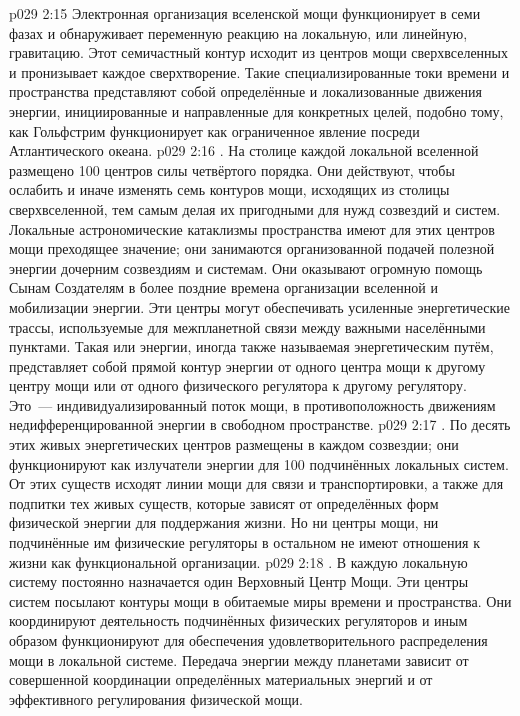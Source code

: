 \vs p029 2:15 Электронная организация вселенской мощи функционирует в семи фазах и обнаруживает переменную реакцию на локальную, или линейную, гравитацию. Этот семичастный контур исходит из центров мощи сверхвселенных и пронизывает каждое сверхтворение. Такие специализированные токи времени и пространства представляют собой определённые и локализованные движения энергии, инициированные и направленные для конкретных целей, подобно тому, как Гольфстрим функционирует как ограниченное явление посреди Атлантического океана.
\vs p029 2:16 . На столице каждой локальной вселенной размещено 100 центров силы четвёртого порядка. Они действуют, чтобы ослабить и иначе изменять семь контуров мощи, исходящих из столицы сверхвселенной, тем самым делая их пригодными для нужд созвездий и систем. Локальные астрономические катаклизмы пространства имеют для этих центров мощи преходящее значение; они занимаются организованной подачей полезной энергии дочерним созвездиям и системам. Они оказывают огромную помощь Сынам Создателям в более поздние времена организации вселенной и мобилизации энергии. Эти центры могут обеспечивать усиленные энергетические трассы, используемые для межпланетной связи между важными населёнными пунктами. Такая  или  энергии, иногда также называемая энергетическим путём, представляет собой прямой контур энергии от одного центра мощи к другому центру мощи или от одного физического регулятора к другому регулятору. Это~--- индивидуализированный поток мощи, в противоположность движениям недифференцированной энергии в свободном пространстве.
\vs p029 2:17 . По десять этих живых энергетических центров размещены в каждом созвездии; они функционируют как излучатели энергии для 100 подчинённых локальных систем. От этих существ исходят линии мощи для связи и транспортировки, а также для подпитки тех живых существ, которые зависят от определённых форм физической энергии для поддержания жизни. Но ни центры мощи, ни подчинённые им физические регуляторы в остальном не имеют отношения к жизни как функциональной организации.
\vs p029 2:18 . В каждую локальную систему постоянно назначается один Верховный Центр Мощи. Эти центры систем посылают контуры мощи в обитаемые миры времени и пространства. Они координируют деятельность подчинённых физических регуляторов и иным образом функционируют для обеспечения удовлетворительного распределения мощи в локальной системе. Передача энергии между планетами зависит от совершенной координации определённых материальных энергий и от эффективного регулирования физической мощи.
